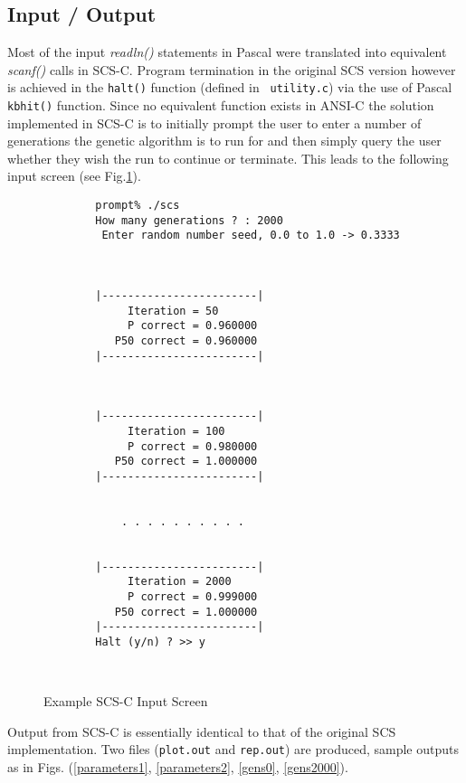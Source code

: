 \subsection{Input / Output}

  Most of the input {\it readln()} statements in Pascal were
translated into equivalent {\it scanf()} calls in SCS-C.
Program termination in the original SCS version however is
achieved in the {\tt halt()} function (defined in {\tt
utility.c}) via the use of Pascal {\tt kbhit()} function.
Since no equivalent function exists in ANSI-C the solution
implemented in SCS-C is to initially prompt the user to enter
a number of generations the genetic algorithm is to run for
and then simply query the user whether they wish the run to
continue or terminate. This leads to the following input
screen (see Fig.\ref{input}).

\begin{figure}
\begin{center}
\begin{verbatim}
        prompt% ./scs
        How many generations ? : 2000
         Enter random number seed, 0.0 to 1.0 -> 0.3333
 
 
 
        |------------------------|
             Iteration = 50
             P correct = 0.960000
           P50 correct = 0.960000
        |------------------------|
 
 
 
        |------------------------|
             Iteration = 100
             P correct = 0.980000
           P50 correct = 1.000000
        |------------------------|


            . . . . . . . . . . 

 
        |------------------------|
             Iteration = 2000
             P correct = 0.999000
           P50 correct = 1.000000
        |------------------------|
        Halt (y/n) ? >> y



\end{verbatim}
\caption{Example SCS-C Input Screen}
\label{input}
\end{center}
\end{figure}


  Output from SCS-C is essentially identical to that of the
original SCS implementation. Two files ({\tt plot.out} and
{\tt rep.out}) are produced, sample outputs as in Figs.
(\ref{parameters1}, \ref{parameters2}, \ref{gens0}, \ref{gens2000}).


